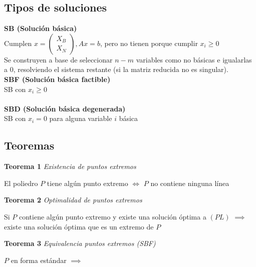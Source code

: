 \documentclass{myclass}
\begin{document}
\subsection{Tipos de soluciones}
\textbf{SB (Solución básica)} \\
Cumplen $x=\begin{pmatrix} X_B\\X_N \end{pmatrix}, Ax=b$, pero no tienen porque cumplir $x_i\geq 0$\\
Se construyen a base de seleccionar $n-m$ variables como no básicas e igualarlas a 0, resolviendo el sistema restante (si la matriz reducida no es singular).
\\
\textbf{SBF (Solución básica factible)} \\
SB con $x_i\geq 0$ \\
\\
\textbf{SBD (Solución básica degenerada)} \\
SB con $x_i = 0$ para alguna variable $i$ básica \\

\subsection{Teoremas}
\textbf{Teorema 1} \textit{Existencia de puntos extremos}
\begin{center}
    El poliedro $P$ tiene algún punto extremo $\iff$ $P$ no contiene ninguna línea
\end{center}
\textbf{Teorema 2} \textit{Optimalidad de puntos extremos}
\begin{center}
    Si $P$ contiene algún punto extremo y existe una solución óptima a $(PL)$ $\implies$ existe una solución óptima que es un extremo de $P$
\end{center}
\textbf{Teorema 3} \textit{Equivalencia puntos extremos (SBF)}
\begin{center}
    $P$ en forma estándar $\implies$ 
\end{center}
\end{document}
